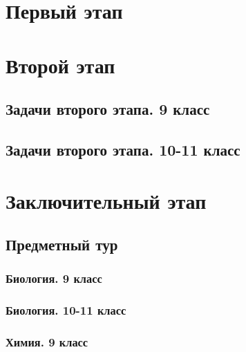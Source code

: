 \documentclass[a4paper,12pt,oneside]{book}
\begin{document}

\setcounter{tocdepth}{1}

\tableofcontents

\part{Первый этап}




\part{Второй этап}
\clearpage
\chapter{Задачи второго этапа. 9 класс}



\chapter{Задачи второго этапа. 10-11 класс}



\part{Заключительный этап}

\clearpage
\chapter{Предметный тур}

\section{Биология. 9 класс}


\section{Биология. 10-11 класс}


\section{Химия. 9 класс}

\end{document}

